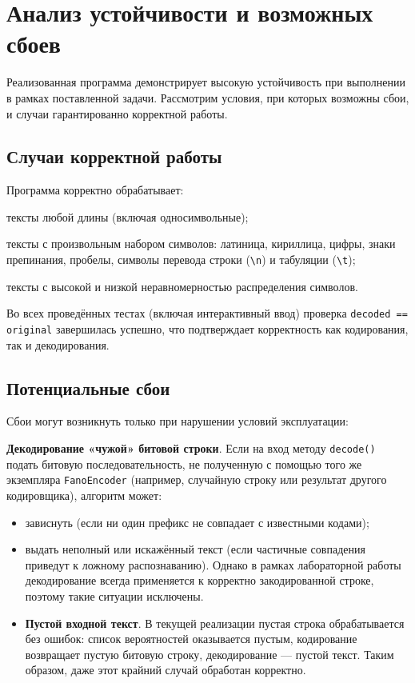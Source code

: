 \documentclass[a4paper,12pt]{article}
\begin{document}
    \section{Анализ устойчивости и возможных сбоев}

Реализованная программа демонстрирует высокую устойчивость при выполнении в рамках поставленной задачи. Рассмотрим условия, при которых возможны сбои, и случаи гарантированно корректной работы.

\subsection{Случаи корректной работы}

Программа корректно обрабатывает:
\item тексты любой длины (включая односимвольные);
    \item тексты с произвольным набором символов: латиница, кириллица, цифры, знаки препинания, пробелы, символы перевода строки (\texttt{\textbackslash n}) и табуляции (\texttt{\textbackslash t});
    \item тексты с высокой и низкой неравномерностью распределения символов.

Во всех проведённых тестах (включая интерактивный ввод) проверка \texttt{decoded == original} завершилась успешно, что подтверждает корректность как кодирования, так и декодирования.

\subsection{Потенциальные сбои}

Сбои могут возникнуть только при нарушении условий эксплуатации:
\item \textbf{Декодирование «чужой» битовой строки}. Если на вход методу \texttt{decode()} подать битовую последовательность, не полученную с помощью того же экземпляра \texttt{FanoEncoder} (например, случайную строку или результат другого кодировщика), алгоритм может:
    \begin{itemize}
        \item зависнуть (если ни один префикс не совпадает с известными кодами);
        \item выдать неполный или искажённый текст (если частичные совпадения приведут к ложному распознаванию).
    Однако в рамках лабораторной работы декодирование всегда применяется к корректно закодированной строке, поэтому такие ситуации исключены.
    
    \item \textbf{Пустой входной текст}. В текущей реализации пустая строка обрабатывается без ошибок: список вероятностей оказывается пустым, кодирование возвращает пустую битовую строку, декодирование — пустой текст. Таким образом, даже этот крайний случай обработан корректно.
\end{itemize}
\end{document}
